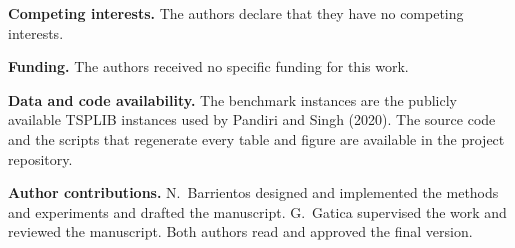 \documentclass[sn-chicago]{sn-jnl}
\begin{document}
\backmatter


\noindent\textbf{Competing interests.} The authors declare that they have no
competing interests.

\noindent\textbf{Funding.} The authors received no specific funding for this work.

\noindent\textbf{Data and code availability.} The benchmark instances are the
publicly available TSPLIB instances used by Pandiri and Singh (2020). The source
code and the scripts that regenerate every table and figure are available in the
project repository.

\noindent\textbf{Author contributions.} N.\ Barrientos designed and implemented the
methods and experiments and drafted the manuscript. G.\ Gatica supervised the work
and reviewed the manuscript. Both authors read and approved the final version.


\end{document}
